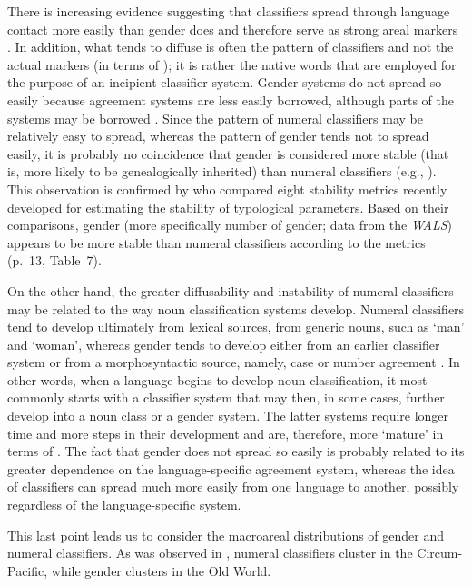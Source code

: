 \documentclass[output=collectionpaper]{langsci/langscibook}
\begin{document}
There is increasing evidence suggesting that classifiers spread through language contact more easily than gender does and therefore serve as strong areal markers \citep[730]{Seifart2010}. In addition, what tends to diffuse is often the pattern of classifiers and not the actual markers (in terms of \citealt[234--237]{Matras2009}); it is rather the native words that are employed for the purpose of an incipient classifier system. Gender systems do not spread so easily because agreement systems are less easily borrowed, although parts of the systems may be borrowed \citep[386--388]{Aikhenvald2000}. Since the pattern of numeral classifiers may be relatively easy to spread, whereas the pattern of gender tends not to spread easily, it is probably no coincidence that gender is considered more stable (that is, more likely to be genealogically inherited) than numeral classifiers (e.g., \citealt[299--303]{Nichols2003}). This observation is confirmed by \citet{Dediu2013} who compared eight stability metrics recently developed for estimating the stability of typological parameters. Based on their comparisons, gender (more specifically number of gender; data from the \textit{WALS}) appears to be more stable than numeral classifiers according to the metrics (p.~13, Table~7).

On the other hand, the greater diffusability and instability of numeral classifiers may be related to the way noun classification systems develop. Numeral classifiers tend to develop ultimately from lexical sources, from generic nouns, such as `man' and `woman', whereas gender tends to develop either from an earlier classifier system or from a morphosyntactic source, namely, case or number agreement \citep{Luraghi2011}. In other words, when a language begins to develop noun classification, it most commonly starts with a classifier system that may then, in some cases, further develop into a noun class or a gender system. The latter systems require longer time and more steps in their development and are, therefore, more `mature' in terms of \citet{Dahl2004}. The fact that gender does not spread so easily is probably related to its greater dependence on the language-specific agreement system, whereas the idea of classifiers can spread much more easily from one language to another, possibly regardless of the language-specific system.

This last point leads us to consider the macroareal distributions of gender and numeral classifiers. As was observed in , numeral classifiers cluster in the Circum-Pacific, while gender clusters in the Old World.
\end{document}
